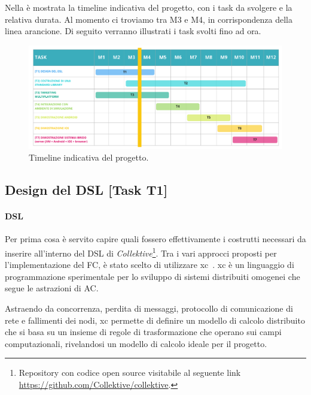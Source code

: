 \documentclass[13pt, a4paper]{article}
\newcommand{\ck}{\emph{Collektive}}
\begin{document}
Nella  è mostrata la timeline indicativa del progetto, con i task da svolgere e la relativa durata.
%
Al momento ci troviamo tra M3 e M4, in corrispondenza della linea arancione.
%
Di seguito verranno illustrati i task svolti fino ad ora.

\begin{figure}
    \centering
    \includegraphics[width=\textwidth]{images/collektive_timeline}
    \caption{Timeline indicativa del progetto.}
    \label{fig:timeline}
\end{figure}

\subsection{Design del DSL [Task T1]}\label{subsec:t1}

\paragraph{DSL}
Per prima cosa è servito capire quali fossero effettivamente i costrutti necessari da inserire all'interno del DSL di \ck{}\footnote{
    Repository con codice open source visitabile al seguente link \url{https://github.com/Collektive/collektive}.
}.
%
Tra i vari approcci proposti per l'implementazione del \ac{FC}, è stato scelto di utilizzare \ac{xc}~\cite{AudritoCDSV24}.
%
\ac{xc} è un linguaggio di programmazione sperimentale per lo sviluppo di sistemi distribuiti omogenei che segue le astrazioni
    di \ac{AC}.

Astraendo da concorrenza, perdita di messaggi, protocollo di comunicazione di rete e fallimenti dei nodi,
    \ac{xc} permette di definire un modello di calcolo distribuito che si basa su un insieme di regole di trasformazione
    che operano sui campi computazionali,
    rivelandosi un modello di calcolo ideale per il progetto.
\end{document}

